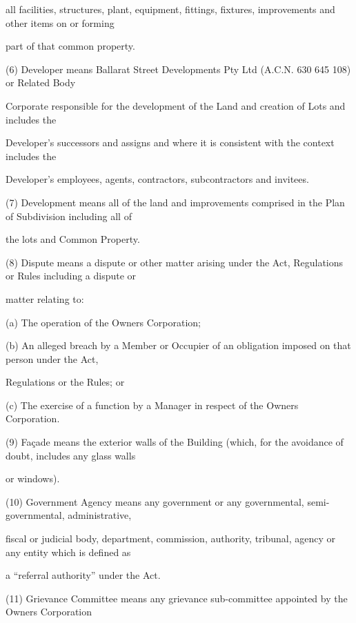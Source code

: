 \documentclass{article}
\begin{document}
{\fontsize{10.02}{1}all facilities, structures, plant, equipment, fittings, fixtures, improvements and other items on or forming }

{\fontsize{10.02}{1}part of that common property. }

{\fontsize{9.962}{1}(6) Developer means Ballarat Street Developments Pty Ltd (A.C.N. 630 645 108) or Related Body }

{\fontsize{10.02}{1}Corporate responsible for the development of the Land and creation of Lots and includes the }

{\fontsize{10.02}{1}Developer’s successors and assigns and where it is consistent with the context includes the }

{\fontsize{10.02}{1}Developer’s employees, agents, contractors, subcontractors and invitees. }

{\fontsize{9.962}{1}(7) Development means all of the land and improvements comprised in the Plan of Subdivision including all of }

{\fontsize{10.02}{1}the lots and Common Property. }

{\fontsize{9.962}{1}(8) Dispute means a dispute or other matter arising under the Act, Regulations or Rules including a dispute or }

{\fontsize{10.02}{1}matter relating to: }

{\fontsize{9.962}{1}(a) The operation of the Owners Corporation; }

{\fontsize{9.962}{1}(b) An alleged breach by a Member or Occupier of an obligation imposed on that person under the Act, }

{\fontsize{10.02}{1}Regulations or the Rules; or }

{\fontsize{9.962}{1}(c) The exercise of a function by a Manager in respect of the Owners Corporation. }

{\fontsize{9.962}{1}(9) Façade means the exterior walls of the Building (which, for the avoidance of doubt, includes any glass walls }

{\fontsize{10.02}{1}or windows). }

{\fontsize{9.962}{1}(10) Government Agency means any government or any governmental, semi-governmental, administrative, }

{\fontsize{10.02}{1}fiscal or judicial body, department, commission, authority, tribunal, agency or any entity which is defined as }

{\fontsize{10.02}{1}a “referral authority” under the Act. }

{\fontsize{9.962}{1}(11) Grievance Committee means any grievance sub-committee appointed by the Owners Corporation }
\end{document}
